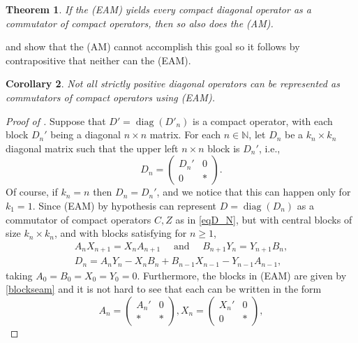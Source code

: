 \documentclass[10pt,reqno]{amsart}
\newtheorem{theorem}{Theorem}[section]
\newtheorem{corollary}[theorem]{Corollary}
\theoremstyle{remark}
\DeclareMathOperator{\diag}{diag}
\numberwithin{equation}{section}
\begin{document}
\begin{theorem}
  \label{tEAM}
  If the (EAM) yields every compact diagonal operator as a commutator of compact operators, then so also does the (AM).
\end{theorem}

 and  show that the (AM) cannot accomplish this goal  so it follows by contrapositive that neither can the (EAM).

\begin{corollary}
  \label{NOTtEAM} Not all strictly positive diagonal operators can be represented as commutators of compact operators using (EAM).
\end{corollary}

\begin{proof}[Proof of ]
  Suppose that $D'=\diag (D'_n)$ is a compact operator, with each block $D_n'$ being a diagonal $n\times n$ matrix.
  For each $n\in\mathbb{N}$, let $D_n$ be a $k_n\times k_n$ diagonal matrix such that the upper left $n\times n$ block is $D_n'$, i.e.,
  \begin{equation*}
    D_n = \begin{pmatrix} D_n' &0\\0& \ast\end{pmatrix}.
  \end{equation*}
  Of course, if $k_n=n$ then $D_n=D_n'$, and we notice that this can happen only for $k_1 = 1$.
  Since (EAM) by hypothesis can represent $D=\diag (D_n)$ as a commutator of compact operators $C,Z$ as in \eqref{eqD_N}, but with  central blocks of size $k_n\times k_n$, and with blocks satisfying for $n \ge 1$,
  \begin{gather}
    A_nX_{n+1}=X_nA_{n+1}\quad\mbox{ and }\quad B_{n+1}Y_n=Y_{n+1}B_n,\label{offdiag}\\
    D_{n}=A_{n}Y_{n}-X_{n}B_{n}+B_{n-1}X_{n-1}-Y_{n-1}A_{n-1},\label{eq13}
  \end{gather}
  taking $A_0=B_0=X_0=Y_0=0$.
  Furthermore, the blocks in (EAM) are given by \eqref{blockseam} and it is not hard to see that each can be written in the form
  \begin{equation}
    \label{matrices}
    A_n=\begin{pmatrix} A_n' & 0\\ \ast & \ast\end{pmatrix},
    X_n=\begin{pmatrix} X_n' & 0\\ 0 & \ast\end{pmatrix},

\end{equation}
\end{proof}
\end{document}
